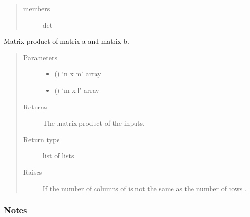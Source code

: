\documentclass[letterpaper,10pt,english]{sphinxmanual}
\begin{document}
\label{\detokenize{index:module-acse_la.det}}\begin{quote}\begin{description}
\item[{members}] \leavevmode
det

\end{description}\end{quote}


\begin{fulllineitems}
Matrix product of matrix a and  matrix b.
\begin{quote}\begin{description}
\item[{Parameters}] \leavevmode\begin{itemize}
\item {} 
 () \textendash{} ‘n x m’ array

\item {} 
 () \textendash{} ‘m x l’ array

\end{itemize}

\item[{Returns}] \leavevmode
{} \textendash{} The matrix product of the inputs.

\item[{Return type}] \leavevmode
list of lists

\item[{Raises}] \leavevmode
{} \textendash{} If the number of columns of  is not the same as
    the number of rows .

\end{description}\end{quote}
\subsubsection*{Notes}


\end{fulllineitems}
\end{document}
